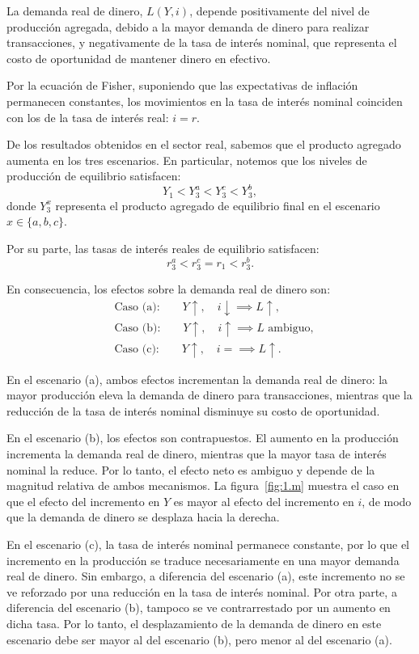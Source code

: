\documentclass[11pt]{article}
\begin{document}
La demanda real de dinero, $L(Y,i)$, depende positivamente del nivel de producción agregada, debido a la mayor demanda de dinero para realizar transacciones, y negativamente de la tasa de interés nominal, que representa el costo de oportunidad de mantener dinero en efectivo.

Por la ecuación de Fisher, suponiendo que las expectativas de inflación permanecen constantes, los movimientos en la tasa de interés nominal coinciden con los de la tasa de interés real: $i = r$.

De los resultados obtenidos en el sector real, sabemos que el producto agregado aumenta en los tres escenarios. En particular, notemos que los niveles de producción de equilibrio satisfacen:
\[
Y_1<Y_3^a<Y_3^c<Y_3^b,
\]
donde $Y_3^x$ representa el producto agregado de equilibrio final en el escenario $x\in\{a,b,c\}$.

Por su parte, las tasas de interés reales de equilibrio satisfacen:
\[
r_3^a<r_3^c=r_1<r_3^b.
\]

En consecuencia, los efectos sobre la demanda real de dinero son:
\begin{align*}
    &\text{Caso (a):}\qquad
    Y\uparrow,\quad i\downarrow
    \implies L\uparrow, \\[4pt]
    &\text{Caso (b):}\qquad
    Y\uparrow,\quad i\uparrow
    \implies L\text{ ambiguo}, \\[4pt]
    &\text{Caso (c):}\qquad
    Y\uparrow,\quad i=
    \implies L\uparrow.
\end{align*}

En el escenario (a), ambos efectos incrementan la demanda real de dinero: la mayor producción eleva la demanda de dinero para transacciones, mientras que la reducción de la tasa de interés nominal disminuye su costo de oportunidad.

En el escenario (b), los efectos son contrapuestos. El aumento en la producción incrementa la demanda real de dinero, mientras que la mayor tasa de interés nominal la reduce. Por lo tanto, el efecto neto es ambiguo y depende de la magnitud relativa de ambos mecanismos. La figura~\ref{fig:1.m} muestra el caso en que el efecto del incremento en $Y$ es mayor al efecto del incremento en $i$, de modo que la demanda de dinero se desplaza hacia la derecha.

En el escenario (c), la tasa de interés nominal permanece constante, por lo que el incremento en la producción se traduce necesariamente en una mayor demanda real de dinero. Sin embargo, a diferencia del escenario (a), este incremento no se ve reforzado por una reducción en la tasa de interés nominal. Por otra parte, a diferencia del escenario (b), tampoco se ve contrarrestado por un aumento en dicha tasa. Por lo tanto, el desplazamiento de la demanda de dinero en este escenario debe ser mayor al del escenario (b), pero menor al del escenario (a).
\end{document}
